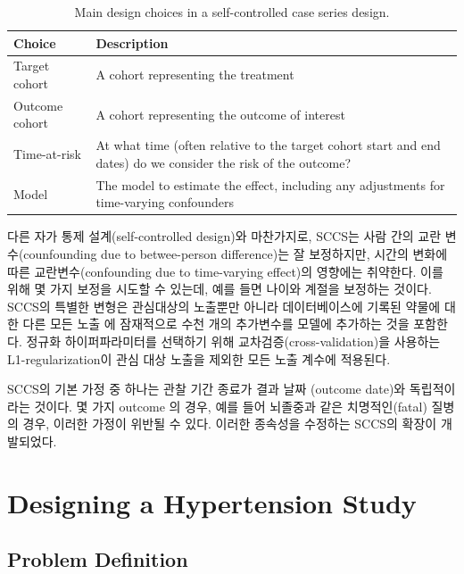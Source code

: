 \documentclass[11pt]{book}
\theoremstyle{definition}
\theoremstyle{definition}
\theoremstyle{definition}
\theoremstyle{remark}
\begin{document}
\begin{table}[t]

\caption{\label{tab:sccsChoices}Main design choices in a self-controlled case series design.}
\centering
\begin{tabu} to 
\toprule
Choice & Description\\
\midrule
Target cohort & A cohort representing the treatment\\
Outcome cohort & A cohort representing the outcome of interest\\
Time-at-risk & At what time (often relative to the target cohort start and end dates) do we consider the risk of the outcome?\\
Model & The model to estimate the effect, including any adjustments for time-varying confounders\\
\bottomrule
\end{tabu}
\end{table}

다른 자가 통제 설계(self-controlled design)와 마찬가지로, SCCS는 사람
간의 교란 변수(counfounding due to betwee-person difference)는 잘
보정하지만, 시간의 변화에 따른 교란변수(confounding due to time-varying
effect)의 영향에는 취약한다. 이를 위해 몇 가지 보정을 시도할 수 있는데,
예를 들면 나이와 계절을 보정하는 것이다. SCCS의 특별한 변형은 관심대상의
노출뿐만 아니라 데이터베이스에 기록된 약물에 대한 다른 모든 노출
\citep{simpson_2013}에 잠재적으로 수천 개의 추가변수를 모델에 추가하는
것을 포함한다. 정규화 하이퍼파라미터를 선택하기 위해
교차검증(cross-validation)을 사용하는 L1-regularization이 관심 대상
노출을 제외한 모든 노출 계수에 적용된다.

SCCS의 기본 가정 중 하나는 관찰 기간 종료가 결과 날짜 (outcome date)와
독립적이라는 것이다. 몇 가지 outcome 의 경우, 예를 들어 뇌졸중과 같은
치명적인(fatal) 질병의 경우, 이러한 가정이 위반될 수 있다. 이러한
종속성을 수정하는 SCCS의 확장이 개발되었다. \citep{farrington_2011}

\section{Designing a Hypertension
Study}\label{designing-a-hypertension-study}

\subsection{Problem Definition}\label{problem-definition-1}
\end{document}

